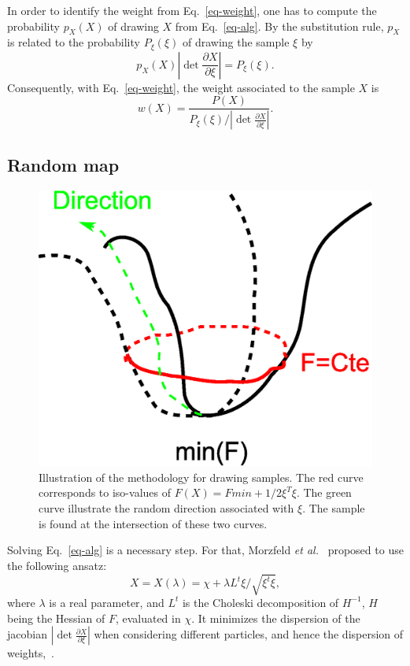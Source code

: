 \documentclass[aip,pof,nofootinbib,reprint,onecolumn]{revtex4-1}
\newcommand{\mypar}[1]{\left(#1\right)}
\newcommand{\rpoint}{X}
\begin{document}
In order to identify the weight from Eq.~\eqref{eq-weight}, one has to compute the probability $p_{\rpoint}\mypar{\rpoint}$ of drawing $X$ from Eq.~\eqref{eq-alg}.
By the substitution rule, $p_X$ is related to the probability $P_{\xi}\mypar{\xi}$ of drawing the sample $\xi$ by
$$
p_{\rpoint}\mypar{\rpoint} \left|\det \frac{\partial \rpoint}{\partial \xi}\right|  = P_{\xi}\mypar{\xi}.
$$
Consequently, with Eq.~\eqref{eq-weight}, the weight associated to the sample $\rpoint$ is
\begin{equation}
w\mypar{\rpoint} = \frac{P\mypar{\rpoint}}{P_{\xi}\mypar{\xi}/\left|\det \frac{\partial \rpoint}{\partial \xi}\right|}.
\label{eq-weight_dev}
\end{equation}




\subsection{Random map}
\begin{figure}[t]
\center
\includegraphics[height=.25\linewidth]{./min.eps}
\caption{\small Illustration of the methodology for drawing samples. The red curve corresponds to iso-values of $F\mypar{\rpoint} = Fmin+1/2 \xi^T\xi$. The green curve illustrate the random direction associated with $\xi$. The sample is found at the intersection of these two curves.}
\label{fig-rmap}
\end{figure}

Solving Eq.~\eqref{eq-alg} is a necessary step. For that, Morzfeld \emph{et al.}~\cite{Morzfeld2012} proposed to use the following ansatz:
\begin{equation}
\rpoint = \rpoint\mypar{\lambda} = \chi + \lambda L^t \xi/\sqrt{\xi^t \xi},
\label{eq-ansatz}
\end{equation}
where $\lambda$ is a real parameter, and $L^t$ is the Choleski decomposition of $H^{-1}$, $H$ being the Hessian of $F$, evaluated in $\chi$.
It minimizes the dispersion of the jacobian $\left|\det \frac{\partial \rpoint}{\partial \xi}\right|$ when considering different particles, and hence the dispersion of weights,~\citep{Morzfeld2012}.
\end{document}
